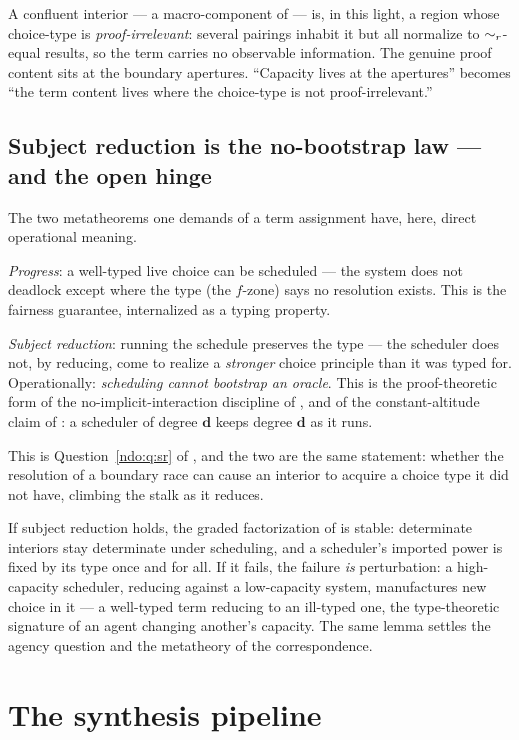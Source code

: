 A confluent interior --- a macro-component of \chApr --- is, in this light, a region whose choice-type
is \emph{proof-irrelevant}: several pairings inhabit it but all normalize to $\sim_{r}$-equal results, so the
term carries no observable information. The genuine proof content sits at the boundary apertures. ``Capacity
lives at the apertures'' becomes ``the term content lives where the choice-type is not
proof-irrelevant.''

\subsection{Subject reduction is the no-bootstrap law --- and the open hinge}

The two metatheorems one demands of a term assignment have, here, direct operational meaning.

\emph{Progress}: a well-typed live choice can be scheduled --- the system does not deadlock except where the
type (the $f$-zone) says no resolution exists. This is the fairness guarantee, internalized as a typing property.

\emph{Subject reduction}: running the schedule preserves the type --- the scheduler does not, by reducing,
come to realize a \emph{stronger} choice principle than it was typed for. Operationally: \emph{scheduling
cannot bootstrap an oracle}. This is the proof-theoretic form of the no-implicit-interaction discipline of
\cite{paths}, and of the constant-altitude claim of \chAgy: a scheduler of degree $\mathbf d$ keeps
degree $\mathbf d$ as it runs.

This is Question~\ref{ndo:q:sr} of \chAgy, and the two are the same statement:
whether the resolution of a boundary race can cause an interior to acquire a
choice type it did not have, climbing the stalk as it reduces.

\noindent
If subject reduction holds, the graded factorization of \chAgy is stable: determinate interiors stay determinate
under scheduling, and a scheduler's imported power is fixed by its type once and for all. If it fails, the
failure \emph{is} perturbation: a high-capacity scheduler, reducing against a low-capacity system, manufactures
new choice in it --- a well-typed term reducing to an ill-typed one, the type-theoretic signature of an agent
changing another's capacity. The same lemma settles the agency question and the metatheory of the correspondence.

\section{The synthesis pipeline}\label{chs:sec:pipeline}

